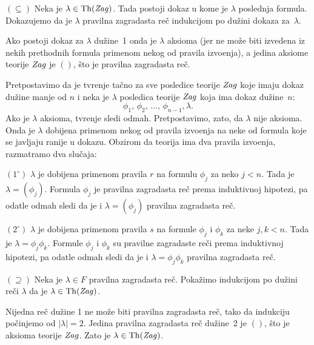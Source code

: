 $(\subseteq)$ Neka je $\lambda \in \mathrm{Th}(\mathit{Zag})$. Tada postoji dokaz u kome je $\lambda$
poslednja formula. Dokazujemo da je $\lambda$ pravilna zagradasta re\v c
indukcijom po du\v zini dokaza za~$\lambda$.

Ako postoji dokaz za $\lambda$ du\v zine~1
onda je $\lambda$ aksioma (jer ne mo\v ze biti izvedena iz nekih prethodnih formula primenom nekog od
pravila izvo\dj enja), a jedina aksiome teorije $\mathit{Zag}$ je $()$, \v sto je pravilna zagradasta re\v c.

Pretpostavimo da je tvr\dj enje ta\v cno za sve posledice teorije $\mathit{Zag}$ koje imaju dokaz du\v zine
manje od $n$ i neka je $\lambda$ posledica teorije $\mathit{Zag}$ koja ima dokaz du\v zine~$n$:
$$
  \phi_1, \, \phi_2, \, \ldots, \, \phi_{n-1}, \lambda.
$$
Ako je $\lambda$ aksioma, tvr\dj enje sledi odmah. Pretpostavimo, zato, da $\lambda$ nije aksioma.
Onda je $\lambda$ dobijena primenom nekog od pravila izvo\dj enja na neke od formula koje se javljaju
ranije u dokazu. Obzirom da teorija ima dva pravila izvo\dj enja, razmatramo dva slu\v caja:

\medskip

$(1^\circ)$ $\lambda$ je dobijena primenom pravila $r$ na formulu $\phi_j$ za neko $j < n$. Tada je
$\lambda = (\phi_j)$. Formula $\phi_j$ je pravilna zagradasta re\v c prema induktivnoj hipotezi, pa odatle
odmah sledi da je i $\lambda = (\phi_j)$ pravilna zagradasta re\v c.

\medskip

$(2^\circ)$ $\lambda$ je dobijena primenom pravila $s$ na formule $\phi_j$  i $\phi_k$
za neke $j, k < n$. Tada je $\lambda = \phi_j \phi_k$.
Formule $\phi_j$ i $\phi_k$ su pravilne zagradaste re\v ci prema induktivnoj hipotezi, pa odatle
odmah sledi da je i $\lambda = \phi_j \phi_k$ pravilna zagradasta re\v c.

\medskip

$(\supseteq)$ Neka je $\lambda \in F$ pravilna zagradasta re\v c. Poka\v zimo indukcijom po du\v zini
re\v ci $\lambda$ da je $\lambda \in \mathrm{Th}(\mathit{Zag})$.

Nijedna re\v c du\v zine 1 ne mo\v ze biti pravilna zagradasta re\v c, tako da indukciju po\v cinjemo
od $|\lambda| = 2$. Jedina pravilna zagradasta re\v c du\v zine~2 je $()$, \v sto je
aksioma teorije $\mathit{Zag}$. Zato je $\lambda \in \mathrm{Th}(\mathit{Zag})$.

